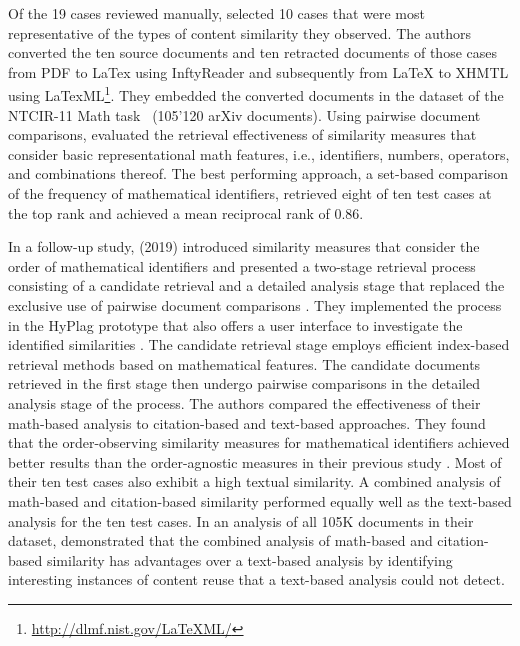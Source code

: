 \documentclass{llncs}
\begin{document}
Of the 19 cases reviewed manually, \citeauthor{Meuschke2017a} selected 10 cases that were most representative of the types of content similarity they observed. The authors converted the ten source documents and ten retracted documents of those cases from PDF to LaTex using InftyReader \cite{Suzuki2004} and subsequently from LaTeX to XHMTL using LaTexML\footnote{\url{http://dlmf.nist.gov/LaTeXML/}}. They embedded the converted documents in the dataset of the NTCIR-11 Math task~\cite{Aizawa2014} (105'120 arXiv documents). Using pairwise document comparisons, \citeauthor{Meuschke2017a} evaluated the retrieval effectiveness of similarity measures that consider basic representational math features, i.e., identifiers, numbers, operators, and combinations thereof. The best performing approach, a set-based comparison of the frequency of mathematical identifiers, retrieved eight of ten test cases at the top rank and achieved a mean reciprocal rank of $0.86$.

In a follow-up study, \citeauthor{Meuschke2019} (2019) introduced similarity measures that consider the order of mathematical identifiers and presented a two-stage retrieval process consisting of a candidate retrieval and a detailed analysis stage that replaced the exclusive use of pairwise document comparisons \cite{Meuschke2019}. They implemented the process in the HyPlag prototype that also offers a user interface to investigate the identified similarities \cite{Meuschke2018a}. The candidate retrieval stage employs efficient index-based retrieval methods based on mathematical features. The candidate documents retrieved in the first stage then undergo pairwise comparisons in the detailed analysis stage of the process. The authors compared the effectiveness of their math-based analysis to citation-based and text-based approaches. They found that the order-observing similarity measures for mathematical identifiers achieved better results than the order-agnostic measures in their previous study \cite{Meuschke2017a}. Most of their ten test cases also exhibit a high textual similarity. A combined analysis of math-based and citation-based similarity performed equally well as the text-based analysis for the ten test cases. In an analysis of all 105K documents in their dataset, \citeauthor{Meuschke2019} demonstrated that the combined analysis of math-based and citation-based similarity has advantages over a text-based analysis by identifying interesting instances of content reuse that a text-based analysis could not detect.
\end{document}

